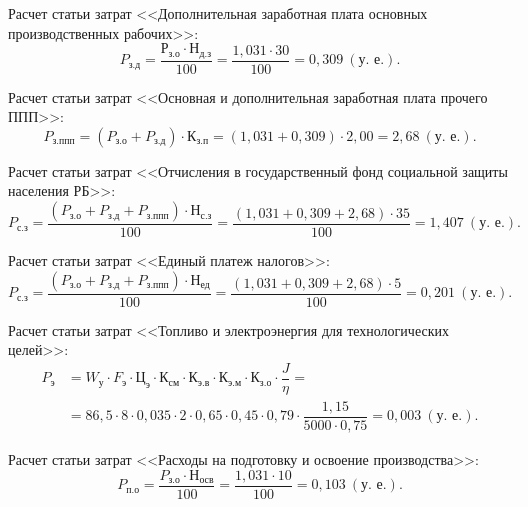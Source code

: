 Расчет статьи затрат 
<<Дополнительная заработная плата основных производственных рабочих>>:
\begin{equation*}
P_{\text{з.д}} = 
\dfrac{\text{Р}_{\text{з.о}} \cdot \text{Н}_{\text{д.з}}}{100} = 
\dfrac{1{,}031 \cdot 30}{100} = 
0{,}309 \: (\text{у.~е.}).
\end{equation*}

Расчет статьи затрат 
<<Основная и дополнительная заработная плата прочего ППП>>:
\begin{equation*}
P_{\text{з.ппп}} = 
( P_{\text{з.о}} + P_{\text{з.д}} ) \cdot \text{К}_{\text{з.п}} =
( 1{,}031 + 0{,}309 ) \cdot 2{,}00 =
2{,}68 \: (\text{у.~е.}).
\end{equation*}

Расчет статьи затрат 
<<Отчисления в государственный фонд социальной защиты населения РБ>>:
\begin{equation*}
P_{\text{с.з}} = 
\dfrac{
  (P_{\text{з.о}} + P_{\text{з.д}}  + P_{\text{з.ппп}}) \cdot \text{Н}_{\text{с.з}}
}{
  100
} =
\dfrac{( 1{,}031 + 0{,}309 + 2{,}68 ) \cdot 35}{100} =
1{,}407 \: (\text{у.~е.}).
\end{equation*}

Расчет статьи затрат 
<<Единый платеж налогов>>:
\begin{equation*}
P_{\text{с.з}} = 
\dfrac{
  (P_{\text{з.о}} + P_{\text{з.д}}  + P_{\text{з.ппп}}) \cdot \text{Н}_{\text{ед}}
}{
  100
} =
\dfrac{( 1{,}031 + 0{,}309 + 2{,}68 ) \cdot 5}{100} =
0{,}201 \: (\text{у.~е.}).
\end{equation*}

Расчет статьи затрат 
<<Топливо и электроэнергия для технологических целей>>:
\begin{align*}
P_{\text{э}} &= 
W_{\text{у}} \cdot F_{\text{э}} \cdot \text{Ц}_{\text{э}} \cdot
\text{К}_{\text{см}} \cdot \text{К}_{\text{э.в}} \cdot 
\text{К}_{\text{э.м}} \cdot \text{К}_{\text{з.о}} \cdot
\dfrac{J}{\eta} = \\
 &=
86{,}5 \cdot 8 \cdot 0{,}035 \cdot
2 \cdot 0{,}65 \cdot 0{,}45 \cdot 
0{,}79 \cdot 
\dfrac{1{,}15}{5000 \cdot 0{,}75} =
0{,}003 \: (\text{у.~е.}).
\end{align*}

Расчет статьи затрат 
<<Расходы на подготовку и освоение производства>>:
\begin{equation*}
P_{\text{п.о}} = 
\dfrac{
  P_{\text{з.о}} \cdot \text{Н}_{\text{осв}}
}{
  100
} =
\dfrac{1{,}031 \cdot 10}{100} =
0{,}103 \: (\text{у.~е.}).
\end{equation*}

